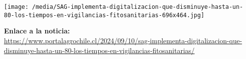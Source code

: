 \documentclass{article}
\begin{document}
\begin{flushright}
\texttt{[image: /media/SAG-implementa-digitalizacion-que-disminuye-hasta-un-80-los-tiempos-en-vigilancias-fitosanitarias-696x464.jpg]} %
\end{flushright}

\vspace{10mm}

\noindent
\textbf{Enlace a la noticia:} \\
\href{https://www.portalagrochile.cl/2024/09/10/sag-implementa-digitalizacion-que-disminuye-hasta-un-80-los-tiempos-en-vigilancias-fitosanitarias/}{https://www.portalagrochile.cl/2024/09/10/sag-implementa-digitalizacion-que-disminuye-hasta-un-80-los-tiempos-en-vigilancias-fitosanitarias/}
\end{document}
